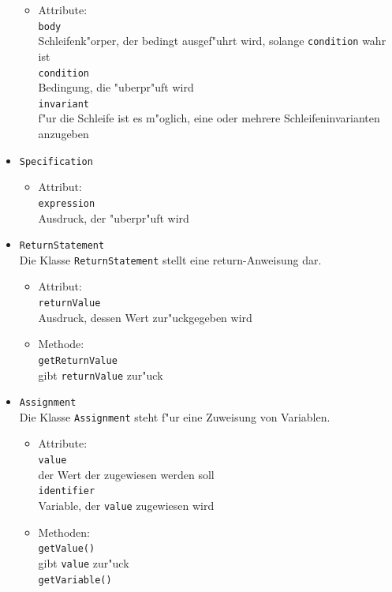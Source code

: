 \documentclass[10pt,a4paper,titlepage]{article}
\begin{document}
\begin{itemize}
\begin{itemize}
\item Attribute: \\
\texttt{body} \\
Schleifenk"orper, der bedingt ausgef"uhrt wird, solange \texttt{condition} wahr ist \\
\texttt{condition} \\
Bedingung, die "uberpr"uft wird \\
\texttt{invariant} \\
f"ur die Schleife ist es m"oglich, eine oder mehrere Schleifeninvarianten anzugeben 
\end{itemize}
\item \texttt{Specification}
\begin{itemize}
\item Attribut: \\
\texttt{expression} \\
Ausdruck, der "uberpr"uft wird
\end{itemize}
\item \texttt{ReturnStatement} \\
Die Klasse \texttt{ReturnStatement} stellt eine return-Anweisung dar. 
\begin{itemize}
\item Attribut: \\
\texttt{returnValue} \\
Ausdruck, dessen Wert zur"uckgegeben wird 
\item Methode: \\
\texttt{getReturnValue} \\
gibt \texttt{returnValue} zur"uck
\end{itemize}
\item \texttt{Assignment} \\
Die Klasse \texttt{Assignment} steht f"ur eine Zuweisung von Variablen.
\begin{itemize}
\item Attribute: \\
\texttt{value} \\
der Wert der zugewiesen werden soll \\
\texttt{identifier} \\
Variable, der \texttt{value} zugewiesen wird
\item Methoden: \\
\texttt{getValue()} \\
gibt \texttt{value} zur"uck \\
\texttt{getVariable()} \\

\end{itemize}
\end{itemize}
\end{document}

